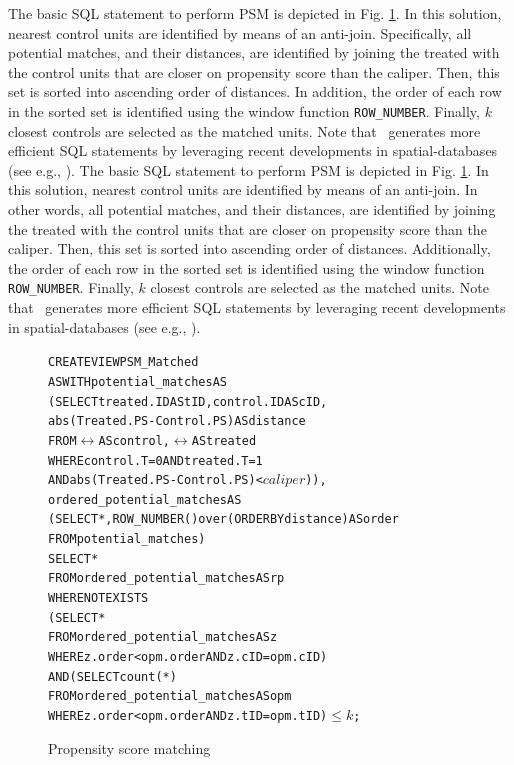 The basic SQL statement to perform PSM
is depicted in Fig. \ref{fig:nnmnr}.
In this solution,
nearest control units are identified
by means of an anti-join.
Specifically, all potential matches, and their distances, are identified by
joining the treated with the control units that are closer on propensity score than
the caliper. Then, this set is sorted into ascending order of
distances.  In addition, the order of each row in the sorted set is identified
using the window function {\verb|ROW_NUMBER|}.
Finally, $k$ closest controls are selected as the matched units. Note that \GSQL\  generates more efficient SQL statements by
leveraging recent developments in  spatial-databases
(see e.g., \cite{obe2015postgis}).
The basic SQL statement to perform PSM is depicted in Fig. \ref{fig:nnmnr}. In this solution, nearest control units are identified by means of an anti-join. In other words, all potential matches, and their distances, are identified by joining the treated with the control units that are closer on propensity score than the caliper. Then, this set is sorted into ascending order of distances. Additionally, the order of each row in the sorted set is identified using the window function {\verb|ROW_NUMBER|}. Finally, $k$ closest controls are selected as the matched units. Note that \GSQL\  generates more efficient SQL statements by leveraging recent developments in spatial-databases (see e.g., \cite{obe2015postgis}).


\begin{figure}
  \centering
\begin{alltt} \scriptsize
CREATE VIEW PSM_Matched
AS WITH potential_matches AS
  (SELECT treated.ID AS tID, control.ID AS cID,
          abs(Treated.PS-Control.PS)  AS distance
   FROM \(\rel\) AS control, \(\rel\) AS treated
   WHERE control.T=0 AND treated.T=1
     AND abs(Treated.PS-Control.PS) < \(caliper\))),
            ordered_potential_matches AS
  (SELECT *, ROW_NUMBER() over (ORDER BY distance) AS order
   FROM potential_matches)
SELECT *
FROM ordered_potential_matches AS rp
WHERE NOT EXISTS
    (SELECT *
     FROM ordered_potential_matches AS z
     WHERE z.order < opm.order AND z.cID=opm.cID)
  AND (SELECT count(*)
     FROM ordered_potential_matches AS opm
     WHERE z.order < opm.order AND z.tID=opm.tID)\( \leq k\);
\end{alltt} \vspace{-.3cm}
  \caption{ Propensity score matching}\label{fig:nnmnr}
\end{figure}


